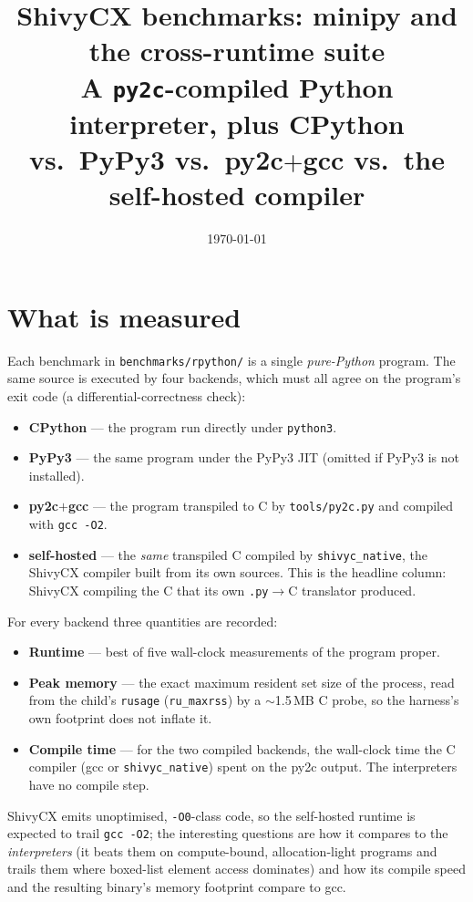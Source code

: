 \documentclass[11pt]{article}
\title{ShivyCX benchmarks: minipy and the cross-runtime suite\\
\large A \texttt{py2c}-compiled Python interpreter, plus
CPython vs.\ PyPy3 vs.\ py2c$+$gcc vs.\ the self-hosted compiler}
\date{\today}
\begin{document}
\maketitle



\section{What is measured}

Each benchmark in \texttt{benchmarks/rpython/} is a single \emph{pure-Python}
program. The same source is executed by four backends, which must all agree on
the program's exit code (a differential-correctness check):

\begin{itemize}
  \item \textbf{CPython} --- the program run directly under \texttt{python3}.
  \item \textbf{PyPy3} --- the same program under the PyPy3 JIT (omitted if PyPy3
        is not installed).
  \item \textbf{py2c$+$gcc} --- the program transpiled to C by
        \texttt{tools/py2c.py} and compiled with \texttt{gcc -O2}.
  \item \textbf{self-hosted} --- the \emph{same} transpiled C compiled by
        \texttt{shivyc\_native}, the ShivyCX compiler built from its own
        sources. This is the headline column: ShivyCX compiling the C that its
        own \texttt{.py}$\rightarrow$C translator produced.
\end{itemize}

For every backend three quantities are recorded:

\begin{itemize}
  \item \textbf{Runtime} --- best of five wall-clock measurements of the program
        proper.
  \item \textbf{Peak memory} --- the exact maximum resident set size of the
        process, read from the child's \texttt{rusage} (\texttt{ru\_maxrss}) by
        a $\sim$1.5\,MB C probe, so the harness's own footprint does not inflate
        it.
  \item \textbf{Compile time} --- for the two compiled backends, the wall-clock
        time the C compiler (gcc or \texttt{shivyc\_native}) spent on the py2c
        output. The interpreters have no compile step.
\end{itemize}

ShivyCX emits unoptimised, \texttt{-O0}-class code, so the self-hosted runtime is
expected to trail \texttt{gcc -O2}; the interesting questions are how it compares
to the \emph{interpreters} (it beats them on compute-bound, allocation-light
programs and trails them where boxed-list element access dominates) and how its
compile speed and the resulting binary's memory footprint compare to gcc.
\end{document}
